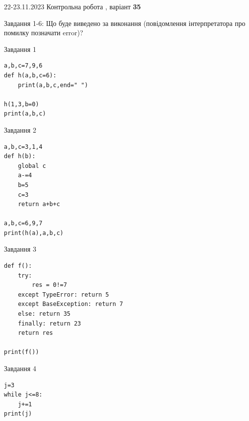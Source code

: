 \documentclass[12pt, ukrainian]{article}
\begin{document}
{{22-23.11.2023 Контрольна робота , варіант  \No \textbf { 35 }\par}}
{

Завдання 1-6: Що буде виведено за виконання (повідомлення інтерпретатора про помилку позначати error)?


\begin{minipage}[t]{9.7cm}                
{\begin{center}Завдання {1}\end{center}}
\begin{verbatim}
a,b,c=7,9,6
def h(a,b,c=6):
    print(a,b,c,end=" ")

h(1,3,b=0)
print(a,b,c)
\end{verbatim}     
\end{minipage}
\vline \hspace{8mm}
\begin{minipage}[t]{8.0cm}                
{\begin{center}Завдання {2}\end{center}}
\begin{verbatim}
a,b,c=3,1,4
def h(b):
    global c
    a-=4
    b=5
    c=3
    return a+b+c

a,b,c=6,9,7
print(h(a),a,b,c)
\end{verbatim}     
\end{minipage}

\vspace{15mm}
\begin{minipage}[t]{9.7cm}                
{\begin{center}Завдання {3}\end{center}}
\begin{verbatim}
def f():
    try:
        res = 0!=7
    except TypeError: return 5
    except BaseException: return 7
    else: return 35
    finally: return 23
    return res

print(f())
\end{verbatim}     
\end{minipage}
\vline \hspace{8mm}
\begin{minipage}[t]{8.0cm}                
{\begin{center}Завдання {4}\end{center}}
\begin{verbatim}
j=3
while j<=8:
    j+=1
print(j)
\end{verbatim}     
\end{minipage}

}
\end{document}
